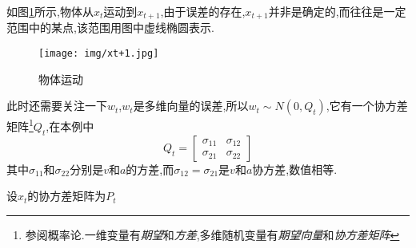 \documentclass{ctexart}
\begin{document}
如图\ref{xt-xt+1}所示,物体从$x_t$运动到$x_{t+1}$,由于误差的存在,$x_{t+1}$并非是确定的,而往往是一定范围中的某点,该范围用图中虚线椭圆表示.
\begin{figure}[hbt]
  \centering
  \texttt{[image: img/xt+1.jpg]}
  \caption{物体运动}
  \label{xt-xt+1}
\end{figure}

此时还需要关注一下$w_t$,$w_t$是多维向量的误差,所以$w_t\sim N(0,Q_t)$,它有一个协方差矩阵\footnote{参阅概率论.一维变量有\emph{期望}和\emph{方差},多维随机变量有\emph{期望向量}和\emph{协方差矩阵}}$Q_t$,在本例中
$$Q_t=
 \left[\begin{matrix}
 	\sigma_{11} & \sigma_{12} \\
 	\sigma_{21} & \sigma_{22}
 \end{matrix}\right]
$$
其中$\sigma_{11}$和$\sigma_{22}$分别是$v$和$a$的方差,而$\sigma_{12}=\sigma_{21}$是$v$和$a$协方差,数值相等.

设$x_t$的协方差矩阵为$P_t$





	
\end{document}
